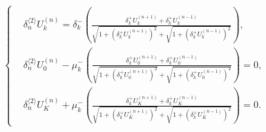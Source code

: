 \documentclass[dvipdfmx-if-dvi,autodetect-engine,ja=standard]{amsart}
\numberwithin{equation}{section} %
\begin{document}
\begin{align}\label{eq:gene:scheme:string}
    \left\{
    \begin{alignedat}{1}
    &\delta_n^{\langle 2\rangle} U_k^{(n)}
    =
    \delta_k^- \left(
    \frac{\delta_k^+ U_k^{(n+1)}+\delta_k^+ U_k^{(n-1)}}{
    \sqrt{1+(\delta_k^+ U_k^{(n+1)})^2}
    + \sqrt{1+(\delta_k^+ U_k^{(n-1)})^2}
    }
    \right)
    ,\\
    &\delta_n^{\langle 2\rangle} U_0^{(n)}
        - \mu_k^-
        \left(
            \frac{\delta_k^+ U_0^{(n+1)}+\delta_k^+ U_0^{(n-1)}}{
    \sqrt{1+(\delta_k^+ U_0^{(n+1)})^2}
    + \sqrt{1+(\delta_k^+ U_0^{(n-1)})^2}
    }
        \right)
        = 0,\\
    &\delta_n^{\langle 2\rangle} U_K^{(n)}
       + \mu_k^-
        \left(
            \frac{\delta_k^+ U_K^{(n+1)}+\delta_k^+ U_K^{(n-1)}}{
    \sqrt{1+(\delta_k^+ U_K^{(n+1)})^2}
    + \sqrt{1+(\delta_k^+ U_K^{(n-1)})^2}
    }
        \right)
        = 0.
    \end{alignedat}
    \right.
\end{align}












\end{document}
